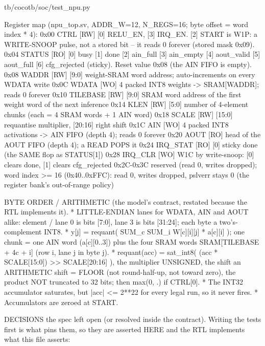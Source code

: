\begin{relocated}{tb/cocotb/soc/test_npu.py}
\begin{textblock}
Register map (npu_top.sv, ADDR_W=12, N_REGS=16; byte offset = word index * 4):
0x00 CTRL      [RW]  [0] RELU_EN, [3] IRQ_EN.  [2] START is W1P: a WRITE-SNOOP pulse, not a stored
bit -- it reads 0 forever (stored mask 0x09).
0x04 STATUS    [RO]  [0] busy [1] done [2] ain_full [3] ain_empty [4] aout_valid [5] aout_full
[6] cfg_rejected (sticky).  Reset value 0x08 (the AIN FIFO is empty).
0x08 WADDR     [RW]  [9:0] weight-SRAM word address; auto-increments on every WDATA write
0x0C WDATA     [WO]  4 packed INT8 weights -> SRAM[WADDR]; reads 0 forever
0x10 TILEBASE  [RW]  [9:0] SRAM word address of the first weight word of the next inference
0x14 KLEN      [RW]  [5:0] number of 4-element chunks (each = 4 SRAM words + 1 AIN word)
0x18 SCALE     [RW]  [15:0] requantise multiplier, [20:16] right shift
0x1C AIN       [WO]  4 packed INT8 activations -> AIN FIFO (depth 4); reads 0 forever
0x20 AOUT      [RO]  head of the AOUT FIFO (depth 4); a READ POPS it
0x24 IRQ_STAT  [RO]  [0] sticky done (the SAME flop as STATUS[1])
0x28 IRQ_CLR   [WO]  W1C by write-snoop: [0] clears done, [1] clears cfg_rejected
0x2C-0x3C reserved (read 0, writes dropped);  word index >= 16 (0x40..0xFFC): read 0, writes
dropped, pslverr stays 0 (the register bank's out-of-range policy)

BYTE ORDER / ARITHMETIC (the model's contract, restated because the RTL implements it).
* LITTLE-ENDIAN lanes for WDATA, AIN and AOUT alike: element / lane 0 is bits [7:0], lane 3 is
bits [31:24]; each byte a two's-complement INT8.
* y[j] = requant( SUM_c SUM_i W[c][i][j] * a[c][i] ); one chunk = one AIN word (a[c][0..3]) plus
the four SRAM words SRAM[TILEBASE + 4c + i] (row i, lane j in byte j).
* requant(acc) = sat_int8( (acc * SCALE[15:0]) >> SCALE[20:16] ), the multiplier UNSIGNED, the
shift an ARITHMETIC shift = FLOOR (not round-half-up, not toward zero), the product NOT
truncated to 32 bits; then max(0, .) if CTRL[0].
* The INT32 accumulator saturates, but |acc| <= 2**22 for every legal run, so it never fires.
* Accumulators are zeroed at START.

DECISIONS the spec left open (or resolved inside the contract).  Writing the tests first is what
pins them, so they are asserted HERE and the RTL implements what this file asserts:


\end{textblock}
\end{relocated}
